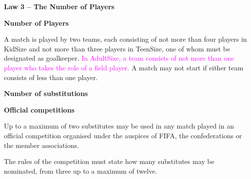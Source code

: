 \clearpage
\sffamily

{\bfseries\color[rgb]{0.4,0.4,0.4}
Law 3 -- The Number of Players}


\bigskip

{\bfseries Number of Players}

\headlinebox

A match is played by two teams, each consisting of not more than four players in KidSize and not more than three players in TeenSize, one of whom must be designated as goalkeeper. \textcolor{magenta}{In AdultSize, a team consists of not more than one player who takes the role of a field player.} A match may not start if either team consists of less than one player.


\bigskip

{\bfseries Number of substitutions}

\headlinebox
 
{\bfseries Official competitions }

Up to a maximum of two  substitutes may be used in any match played in an official competition organised under the auspices of FIFA, the confederations or the member associations.

The rules of the competition must state how many substitutes may be nominated, from three up to a maximum of twelve.

\bigskip


